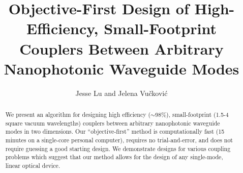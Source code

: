 \documentclass[letterpaper,10pt]{article}
\begin{document}
\title{Objective-First Design of 
    High-Efficiency, Small-Footprint Couplers Between 
    Arbitrary Nanophotonic Waveguide Modes}
\author{Jesse Lu and Jelena Vu\v{c}kovi\'{c}}
\address{Stanford University, Stanford, California, USA.}

\maketitle
\begin{abstract}
We present an algorithm for designing
    high efficiency ($\sim$98\%), 
    small-footprint (1.5-4 square vacuum wavelengths)
    couplers between arbitrary nanophotonic waveguide modes
    in two dimensions.
Our ``objective-first'' method is
    computationally fast (15 minutes on a single-core personal computer), 
    requires no trial-and-error, and
    does not require guessing a good starting design.
We demonstrate designs for various coupling problems which suggest 
    that our method allows for the design of any 
    single-mode, linear optical device.
\end{abstract}
\end{document}
